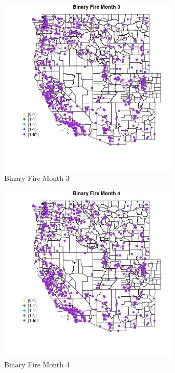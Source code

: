 \begin{figure} 
\centering  
\includegraphics[width=0.77\textwidth]{Code_Outputs/Report_ML_input_PM25_Step4_part_f_de_duplicated_aves_prioritize_24hr_obswNAs_MapObsMo3Binary_Fire.jpg} 
\caption{\label{fig:Report_ML_input_PM25_Step4_part_f_de_duplicated_aves_prioritize_24hr_obswNAsMapObsMo3Binary_Fire}Binary Fire Month 3} 
\end{figure} 
 

\clearpage 

\begin{figure} 
\centering  
\includegraphics[width=0.77\textwidth]{Code_Outputs/Report_ML_input_PM25_Step4_part_f_de_duplicated_aves_prioritize_24hr_obswNAs_MapObsMo4Binary_Fire.jpg} 
\caption{\label{fig:Report_ML_input_PM25_Step4_part_f_de_duplicated_aves_prioritize_24hr_obswNAsMapObsMo4Binary_Fire}Binary Fire Month 4} 
\end{figure} 
 

